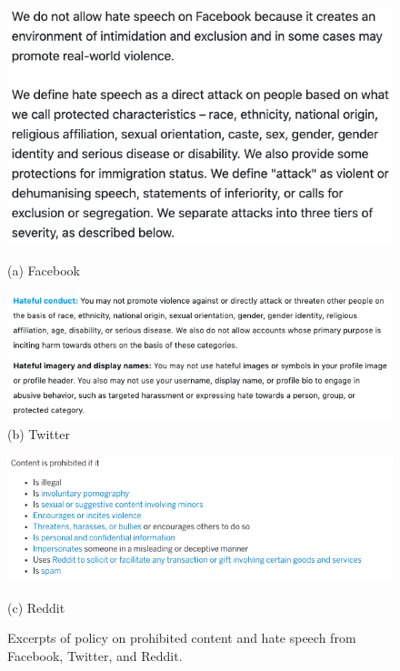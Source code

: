 \begin{figure}[!htb]
  \centering
  \begin{minipage}{0.45\textwidth}
    \includegraphics[width=\linewidth]{Chapter2/Figs/Facebook.png}
    \caption*{(a) Facebook}
  \end{minipage}\hfill
  \begin{minipage}{0.45\textwidth}
    \includegraphics[width=\linewidth]{Chapter2/Figs/Twitter.png}
    \caption*{(b) Twitter}
  \end{minipage}\hfill
\end{figure}
\begin{figure}
  \centering
  \includegraphics[width=\0.45linewidth]{Chapter2/Figs/Reddit.png}
  \caption*{(c) Reddit}
  \caption{Excerpts of policy on prohibited content and hate speech from Facebook, Twitter, and Reddit.}
  \label{fig:policies}
\end{figure}


